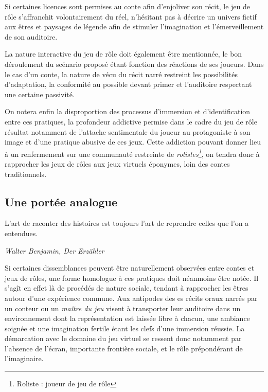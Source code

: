 Si certaines licences sont permises au conte afin d'enjoliver son récit, le jeu de rôle s'affranchit volontairement du réel, n'hésitant pas à décrire un univers fictif aux êtres et paysages de légende afin de stimuler l'imagination et l'émerveillement de son auditoire.

La nature interactive du jeu de rôle doit également être mentionnée, le bon déroulement du scénario proposé étant fonction des réactions de ses joueurs. Dans le cas d'un conte, la nature de vécu du récit narré restreint les possibilités d'adaptation, la conformité au possible devant primer et l'auditoire respectant une certaine passivité.

On notera enfin la disproportion des processus d'immersion et d'identification entre ces pratiques, la profondeur addictive permise dans le cadre du jeu de rôle résultat notamment de l'attache sentimentale du joueur au protagoniste à son image et d'une pratique abusive de ces jeux. Cette addiction pouvant donner lieu à un renfermement sur une communauté restreinte de \textit{rolistes\footnote{Roliste : joueur de jeu de rôle}}, on tendra donc à rapprocher les jeux de rôles aux jeux virtuels éponymes, loin des contes traditionnels.



\subsection{Une portée analogue}

\begin{shadequote}
L'art de raconter des histoires est toujours l'art de reprendre celles que l'on a entendues. \par\emph{Walter Benjamin, Der Erzähler}
\end{shadequote}


Si certaines dissemblances peuvent être naturellement observées entre contes et jeux de rôles, une forme homologue à ces pratiques doit néanmoins être notée. Il s'agît en effet là de procédés de nature sociale, tendant à rapprocher les êtres autour d'une expérience commune. Aux antipodes des es récits oraux narrés par un conteur ou un \textit{maître du jeu} visent à transporter leur auditoire dans un environnement dont la représentation est laissée libre à chacun, une ambiance soignée et une imagination fertile étant les clefs d'une immersion réussie. La démarcation avec le domaine du jeu virtuel se ressent donc notamment par l'absence de l'écran, importante frontière sociale, et le rôle prépondérant de l'imaginaire.

